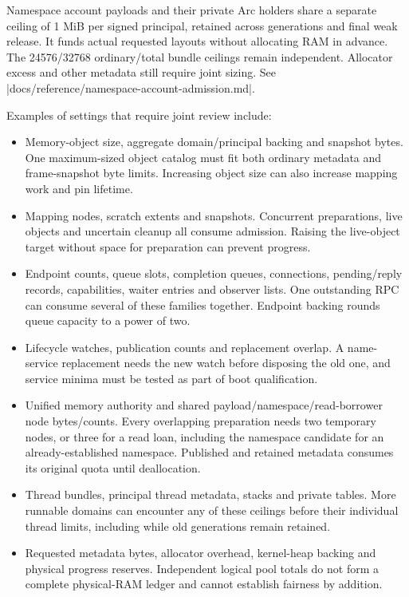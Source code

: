 Namespace account payloads and their private Arc holders share a separate
 ceiling of 1 MiB per
signed principal, retained across generations and final weak release. It funds
actual requested layouts without allocating RAM in advance. The 24576/32768
ordinary/total bundle ceilings remain independent. Allocator excess and other
metadata still require joint sizing. See
\repofile|docs/reference/namespace-account-admission.md|.

Examples of settings that require joint review include:
\begin{itemize}
    \item Memory-object size, aggregate domain/principal backing and snapshot
        bytes. One maximum-sized object catalog must fit both ordinary metadata
        and frame-snapshot byte limits.
        Increasing object size can also increase mapping work and pin lifetime.
    \item Mapping nodes, scratch extents and snapshots. Concurrent preparations,
        live objects and uncertain cleanup all consume admission. Raising the
        live-object target without space for preparation can prevent progress.
    \item Endpoint counts, queue slots, completion queues, connections,
        pending/reply records, capabilities, waiter entries and observer lists.
        One outstanding RPC can consume several of these families together.
        Endpoint backing rounds queue capacity to a power of two.
    \item Lifecycle watches, publication counts and replacement overlap.
        A name-service replacement needs the new watch before disposing the old
        one, and service minima must be tested as part of boot qualification.
    \item Unified memory authority and shared payload/namespace/read-borrower
        node bytes/counts. Every overlapping preparation needs two temporary
        nodes, or three for a read loan, including the namespace candidate for
        an already-established namespace. Published and
        retained metadata consumes its original quota until deallocation.
    \item Thread bundles, principal thread metadata, stacks and private tables.
        More runnable domains can encounter any of these ceilings before their
        individual thread limits, including while old generations remain retained.
    \item Requested metadata bytes, allocator overhead, kernel-heap backing and
        physical progress reserves. Independent logical pool totals do not form
        a complete physical-RAM ledger and cannot establish fairness by addition.
\end{itemize}

